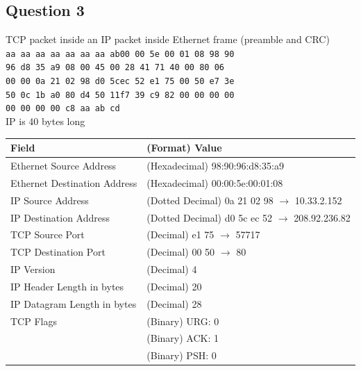 \documentclass[12pt, a4paper]{article}
\begin{document}
\subsection{Question 3}
TCP packet inside an IP packet inside Ethernet frame (preamble and CRC)\\
\texttt{aa aa aa aa aa aa aa ab}\qquad \texttt{00 00 5e 00 01 08 98 90}\\
\texttt{96 d8 35 a9 08 00 45 00 28 41 71 40 00 80 06}\\
\texttt{00 00 0a 21 02 98 d0 5c\qquad ec 52 e1 75 00 50 e7 3e}\\
\texttt{50 0c 1b a0 80 d4 50 11\qquad f7 39 c9 82 00 00 00 00}\\
\texttt{00 00 00 00 c8 aa ab cd}\\
IP is 40 bytes long\\
\begin{table}[H]
	\begin{tabular}{ll}
		\toprule
		Field                        & (Format) Value                                           \\ \midrule
		Ethernet Source Address      & (Hexadecimal) 98:90:96:d8:35:a9                          \\
		Ethernet Destination Address & (Hexadecimal) 00:00:5e:00:01:08                          \\
		IP Source Address            & (Dotted Decimal) 0a 21 02 98 $\rightarrow$ 10.33.2.152   \\
		IP Destination Address       & (Dotted Decimal) d0 5c ec 52 $\rightarrow$ 208.92.236.82 \\
		TCP Source Port              & (Decimal) e1 75 $\rightarrow$ 57717                      \\
		TCP Destination Port         & (Decimal) 00 50 $\rightarrow$ 80                         \\
		IP Version                   & (Decimal) 4                                              \\
		IP Header Length in bytes    & (Decimal) 20                                             \\
		IP Datagram Length in bytes  & (Decimal) 28                                              \\
		TCP Flags                    & (Binary) URG: 0                                          \\
		                             & (Binary) ACK: 1                                          \\
		                             & (Binary) PSH: 0                                          \\

\end{tabular}
\end{table}
\end{document}
